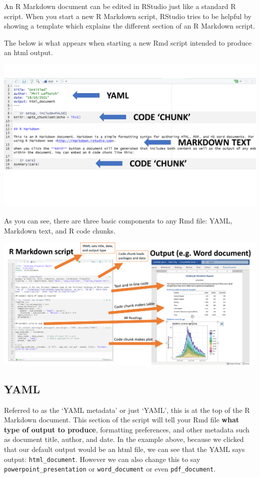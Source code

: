 \documentclass[
]{book}
\begin{document}
An R Markdown document can be edited in RStudio just like a standard R script. When you start a new R Markdown script, RStudio tries to be helpful by showing a template which explains the different section of an R Markdown script.

The below is what appears when starting a new Rmd script intended to produce an html output.

\includegraphics[width=0.8\linewidth]{images/templatermd}

As you can see, there are three basic components to any Rmd file: YAML, Markdown text, and R code chunks.

\includegraphics[width=1\linewidth]{images/rmarkdown_translation}

\hypertarget{yaml}{%
\subsection{YAML}\label{yaml}}

Referred to as the `YAML metadata' or just `YAML', this is at the top of the R Markdown document. This section of the script will tell your Rmd file \textbf{what type of output to produce}, formatting preferences, and other metadata such as document title, author, and date.
In the example above, because we clicked that our default output would be an html file, we can see that the YAML says output: \texttt{html\_document}. However we can also change this to say \texttt{powerpoint\_presentation} or \texttt{word\_document} or even \texttt{pdf\_document}.
\end{document}
